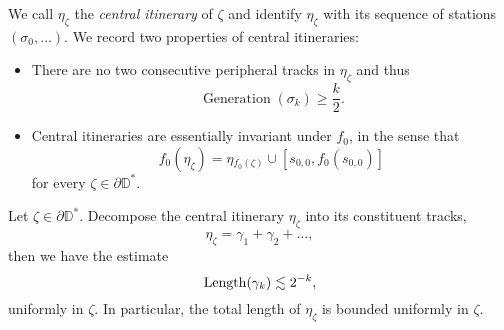 

We call $\eta_{\zeta}$ the \emph{central itinerary} of $\zeta$ and identify $\eta_{\zeta}$ with its sequence of stations $(\sigma_0,\ldots)$. We record two properties of central itineraries:

\begin{itemize}
	\item There are no two consecutive peripheral tracks in $\eta_{\zeta}$ and thus
	\begin{equation} \label{generation-lower-bound}
		\operatorname{Generation}(\sigma_k)\geq \frac k2.
	\end{equation}
	
	\item Central itineraries are essentially invariant under $f_{0}$, in the sense that
	\begin{equation*}
		f_{0}(\eta_{\zeta})=\eta{}_{f_{0}(\zeta)}\cup[s_{0,0},f_0(s_{0,0})]
	\end{equation*}
	for every $\zeta\in \partial \mathbb D^*$.
\end{itemize}

\begin{lemma} \label{track_decay}
Let $\zeta\in \partial \mathbb D^*$. Decompose the central itinerary $\eta_{\zeta}$ into its constituent tracks, 
$$\eta_{\zeta}=\gamma _1 + \gamma_2 + \dots,$$ 
	then we have the estimate $$\operatorname{Length}(\gamma_{k})\lesssim 2^{-k},$$ uniformly in $\zeta$. 
In particular, the total length of $\eta_\zeta$ is bounded uniformly in $\zeta$.
\end{lemma}





